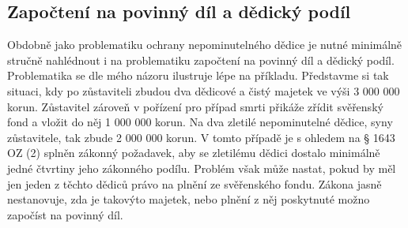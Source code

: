 \documentclass{article}
\begin{document}





\subsection{Započtení na povinný díl a dědický podíl}

Obdobně jako problematiku ochrany nepominutelného dědice je nutné minimálně stručně nahlédnout i na problematiku započtení na povinný díl a dědický podíl.\\

Problematika se dle mého názoru ilustruje lépe na příkladu. Představme si tak situaci, kdy po zůstaviteli zbudou dva dědicové a čistý majetek ve výši 3 000 000 korun. Zůstavitel zároveň v pořízení pro případ smrti přikáže zřídit svěřenský fond a vložit do něj 1 000 000 korun. Na dva zletilé nepominutelné dědice, syny zůstavitele, tak zbude 2 000 000 korun. V tomto případě je s ohledem na § 1643 OZ (2) splněn zákonný požadavek, aby se zletilému dědici dostalo minimálně jedné čtvrtiny jeho zákonného podílu. Problém však může nastat, pokud by měl jen jeden z těchto dědiců právo na plnění ze svěřenského fondu. Zákona jasně nestanovuje, zda je takovýto majetek, nebo plnění z něj poskytnuté možno započíst na povinný díl.\\
\end{document}

